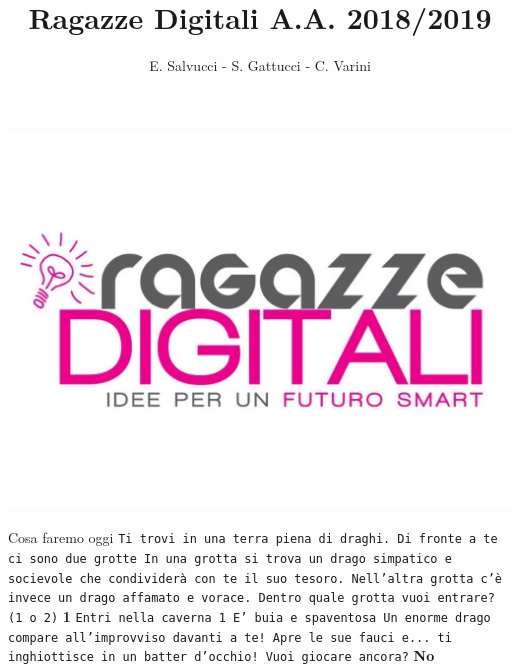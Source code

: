 \documentclass{beamer}
\title[Ragazze Digitali 2019]{Ragazze Digitali A.A. 2018/2019}
\author{E. Salvucci - S. Gattucci - C. Varini}
\date{}
\begin{document}
{\includegraphics[width=\paperwidth,height=\paperheight]{images/ragazze_digitali.jpg}}
\begin{frame}
\end{frame}


\begin{frame}{Cosa faremo oggi}
\texttt{Ti trovi in una terra piena di draghi.\newline
        Di fronte a te ci sono due grotte\newline
        In una grotta si trova un drago simpatico e socievole che condividerà con te il suo tesoro.\newline
        Nell'altra grotta c'è invece un drago affamato e vorace.\newline
        Dentro quale grotta vuoi entrare? (1 o 2)\newline}
\textbf{1\newline}
\texttt{Entri nella caverna 1\newline
        E' buia e spaventosa\newline
        Un enorme drago compare all'improvviso davanti a te! Apre le sue fauci e... ti inghiottisce in un batter d'occhio!\newline
        Vuoi giocare ancora?\newline}
\textbf{No}        
        
\end{frame}




\end{document}
